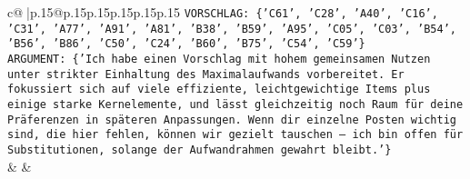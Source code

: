 \documentclass{article}
\begin{document}
{\begin{supertabular}{c@{$\;$}|p{.15\linewidth}@{}p{.15\linewidth}p{.15\linewidth}p{.15\linewidth}p{.15\linewidth}p{.15\linewidth}}
{{{\texttt{VORSCHLAG: \{'C61', 'C28', 'A40', 'C16', 'C31', 'A77', 'A91', 'A81', 'B38', 'B59', 'A95', 'C05', 'C03', 'B54', 'B56', 'B86', 'C50', 'C24', 'B60', 'B75', 'C54', 'C59'\}} \\
\texttt{ARGUMENT: \{'Ich habe einen Vorschlag mit hohem gemeinsamen Nutzen unter strikter Einhaltung des Maximalaufwands vorbereitet. Er fokussiert sich auf viele effiziente, leichtgewichtige Items plus einige starke Kernelemente, und lässt gleichzeitig noch Raum für deine Präferenzen in späteren Anpassungen. Wenn dir einzelne Posten wichtig sind, die hier fehlen, können wir gezielt tauschen – ich bin offen für Substitutionen, solange der Aufwandrahmen gewahrt bleibt.'\}} \\
            }
        }
    }
    & & \\ \\


\end{supertabular}}
\end{document}

